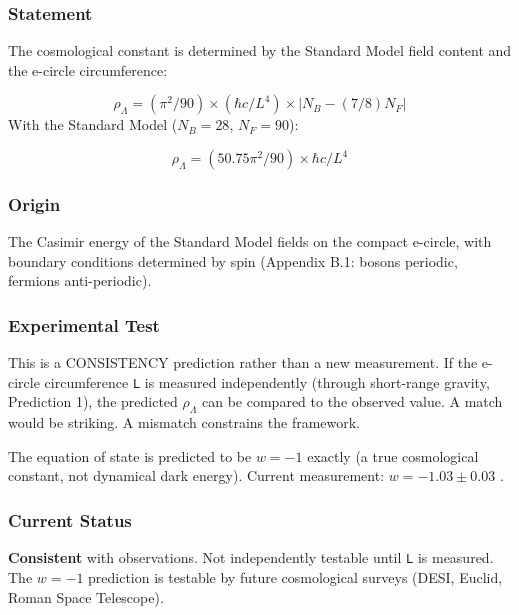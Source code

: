 \documentclass[aps,prd,preprint,superscriptaddress,longbibliography,floatfix]{revtex4-2}
\theoremstyle{remark}
\begin{document}
\subsubsection{Statement}

The cosmological constant is determined by the Standard Model field content and the e-circle circumference:


\begin{equation}
    \rho_\Lambda = (\pi^{2}/90) \times (\hbar c/L^{4}) \times |N_B - (7/8)N_F|
\end{equation}
With the Standard Model ($N_B = 28$, $N_F = 90$):


\begin{equation}
    \rho_\Lambda = (50.75 \pi^{2}/90) \times \hbar c/L^{4}
\end{equation}

\subsubsection{Origin}

The Casimir energy of the Standard Model fields on the compact e-circle, with boundary conditions determined by spin (Appendix B.1: bosons periodic, fermions anti-periodic).


\subsubsection{Experimental Test}

This is a CONSISTENCY prediction rather than a new measurement. If the e-circle circumference \texttt{L} is measured independently (through short-range gravity, Prediction 1), the predicted $\rho_\Lambda$ can be compared to the observed value. A match would be striking. A mismatch constrains the framework.

The equation of state is predicted to be $w = -1$ exactly (a true cosmological constant, not dynamical dark energy). Current measurement: $w = -1.03 \pm 0.03$ \cite{Planck2018_VI}.


\subsubsection{Current Status}

\textbf{Consistent} with observations. Not independently testable until \texttt{L} is measured. The $w = -1$ prediction is testable by future cosmological surveys (DESI, Euclid, Roman Space Telescope).
\end{document}
